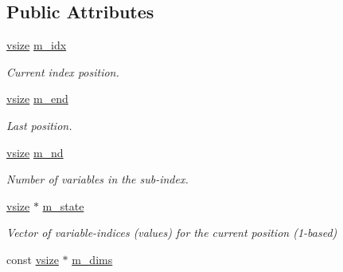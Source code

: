 \subsection*{Public Attributes}
\begin{DoxyCompactItemize}
\item 
\hyperlink{classmerlin_1_1subindex_a85a7fddb94bd83a77a4a73293c5d613a}{vsize} \hyperlink{classmerlin_1_1subindex_ace8d4c5272d59793482b2cfaae5c84b4}{m\+\_\+idx}\hypertarget{classmerlin_1_1subindex_ace8d4c5272d59793482b2cfaae5c84b4}{}\label{classmerlin_1_1subindex_ace8d4c5272d59793482b2cfaae5c84b4}

\begin{DoxyCompactList}\small\item\em Current index position. \end{DoxyCompactList}\item 
\hyperlink{classmerlin_1_1subindex_a85a7fddb94bd83a77a4a73293c5d613a}{vsize} \hyperlink{classmerlin_1_1subindex_ae39e046222b12314a76e22b38a390eaa}{m\+\_\+end}\hypertarget{classmerlin_1_1subindex_ae39e046222b12314a76e22b38a390eaa}{}\label{classmerlin_1_1subindex_ae39e046222b12314a76e22b38a390eaa}

\begin{DoxyCompactList}\small\item\em Last position. \end{DoxyCompactList}\item 
\hyperlink{classmerlin_1_1subindex_a85a7fddb94bd83a77a4a73293c5d613a}{vsize} \hyperlink{classmerlin_1_1subindex_a2acf7a181ba7c7e4550303b45f655af3}{m\+\_\+nd}\hypertarget{classmerlin_1_1subindex_a2acf7a181ba7c7e4550303b45f655af3}{}\label{classmerlin_1_1subindex_a2acf7a181ba7c7e4550303b45f655af3}

\begin{DoxyCompactList}\small\item\em Number of variables in the sub-\/index. \end{DoxyCompactList}\item 
\hyperlink{classmerlin_1_1subindex_a85a7fddb94bd83a77a4a73293c5d613a}{vsize} $\ast$ \hyperlink{classmerlin_1_1subindex_acd8990d2aa72a0650ecb66a15274cc8f}{m\+\_\+state}\hypertarget{classmerlin_1_1subindex_acd8990d2aa72a0650ecb66a15274cc8f}{}\label{classmerlin_1_1subindex_acd8990d2aa72a0650ecb66a15274cc8f}

\begin{DoxyCompactList}\small\item\em Vector of variable-\/indices (values) for the current position (1-\/based) \end{DoxyCompactList}\item 
const \hyperlink{classmerlin_1_1subindex_a85a7fddb94bd83a77a4a73293c5d613a}{vsize} $\ast$ \hyperlink{classmerlin_1_1subindex_ab61eacce232dc804e1c12bf9b0445c3a}{m\+\_\+dims}\hypertarget{classmerlin_1_1subindex_ab61eacce232dc804e1c12bf9b0445c3a}{}\label{classmerlin_1_1subindex_ab61eacce232dc804e1c12bf9b0445c3a}


\end{DoxyCompactItemize}
